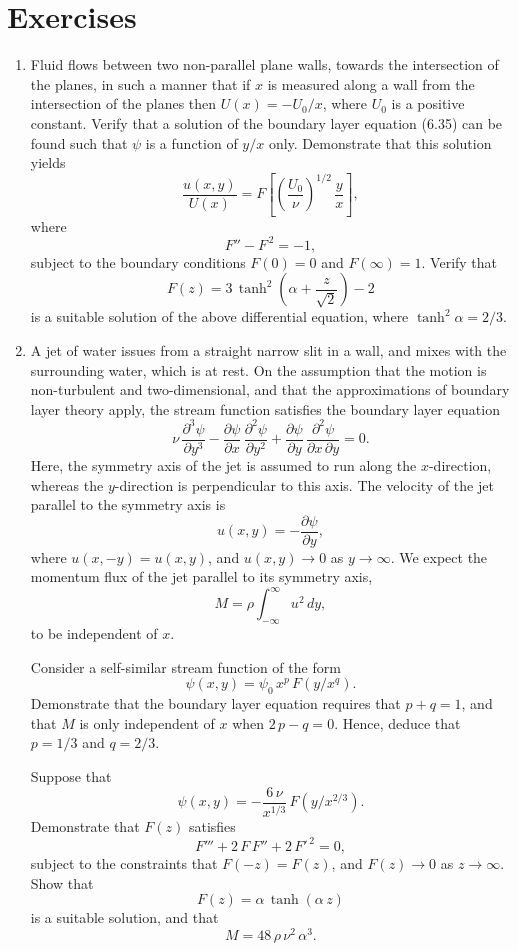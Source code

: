 \section{Exercises}
{\small 
\renewcommand{\theenumi}{6.\arabic{enumi}}
\begin{enumerate}
\item Fluid flows between two non-parallel plane walls, towards the intersection of the planes, in such a  manner that 
if $x$ is measured along a wall from the intersection of the planes then $U(x)=-U_0/x$, where $U_0$ is
a positive constant. Verify that a solution of the boundary layer equation (6.35) can be found
such that $\psi$ is a function of $y/x$ only. Demonstrate that this solution yields
$$
\frac{u(x,y)}{U(x)} = F\left[\left(\frac{U_0}{\nu}\right)^{1/2}\,\frac{y}{x}\right],
$$
where
$$
F'' - F^{\,2} = -1,
$$
subject to the boundary conditions $F(0)=0$ and $F(\infty)=1$. Verify  that
$$
F(z) = 3\,\tanh^2\left(\alpha+\frac{z}{\sqrt{2}}\right)-2
$$
is a suitable solution of the above differential equation, where $\tanh^2\alpha =2/3$. 

\item A jet of water issues from a straight narrow slit in a wall, and mixes with the surrounding water, which is at rest.
On the assumption that the motion is non-turbulent and two-dimensional, and that the approximations of boundary
layer theory apply, the stream function satisfies the boundary layer equation
$$
\nu\,\frac{\partial^3\psi}{\partial y^3}-\frac{\partial\psi}{\partial x}\,\frac{\partial^2\psi}{\partial y^2}
+\frac{\partial\psi}{\partial y}\,\frac{\partial^2\psi}{\partial x\,\partial y} = 0.
$$
Here, the symmetry axis of the jet is assumed to run along the $x$-direction, whereas the $y$-direction is perpendicular to this axis.
The velocity of the jet parallel to the symmetry axis is
$$
u(x,y)= -\frac{\partial\psi}{\partial y},
$$
where $u(x,-y)=u(x,y)$, and $u(x,y)\rightarrow 0$ as $y\rightarrow\infty$. We expect the momentum flux of the
jet parallel to its symmetry axis,
$$
M = \rho\int_{-\infty}^{\infty}u^2\,dy,
$$
to be independent of $x$. 

Consider a self-similar  stream function of the form
$$
\psi(x,y)=\psi_0\,x^p\,F(y/x^q).
$$
Demonstrate that the boundary layer equation requires that $p+q=1$, and that $M$ is only independent of $x$ when
$2\,p-q=0$. Hence, deduce that $p=1/3$ and $q=2/3$. 

Suppose that
$$
\psi(x,y)=-\frac{6\,\nu}{x^{1/3}}\,F(y/x^{2/3}).
$$
Demonstrate that $F(z)$ satisfies
$$
F''' +2\,F\,F'' + 2\,F'^{\,2} = 0,
$$
subject to the constraints that $F(-z)=F(z)$, and $F(z)\rightarrow 0$ as $z\rightarrow\infty$. 
Show that
$$
F(z)=\alpha\,\tanh(\alpha\,z)
$$
is a suitable solution, and that
$$
M= 48\,\rho\,\nu^2\,\alpha^3.
$$


\end{enumerate}}
